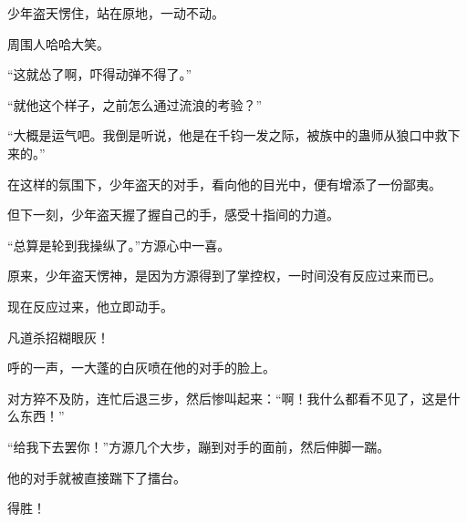 \begin{this_body}
少年盗天愣住，站在原地，一动不动。

周围人哈哈大笑。

“这就怂了啊，吓得动弹不得了。”

“就他这个样子，之前怎么通过流浪的考验？”

“大概是运气吧。我倒是听说，他是在千钧一发之际，被族中的蛊师从狼口中救下来的。”

在这样的氛围下，少年盗天的对手，看向他的目光中，便有增添了一份鄙夷。

但下一刻，少年盗天握了握自己的手，感受十指间的力道。

“总算是轮到我操纵了。”方源心中一喜。

原来，少年盗天愣神，是因为方源得到了掌控权，一时间没有反应过来而已。

现在反应过来，他立即动手。

凡道杀招糊眼灰！

呼的一声，一大蓬的白灰喷在他的对手的脸上。

对方猝不及防，连忙后退三步，然后惨叫起来：“啊！我什么都看不见了，这是什么东西！”

“给我下去罢你！”方源几个大步，蹦到对手的面前，然后伸脚一踹。

他的对手就被直接踹下了擂台。

得胜！

\end{this_body}

